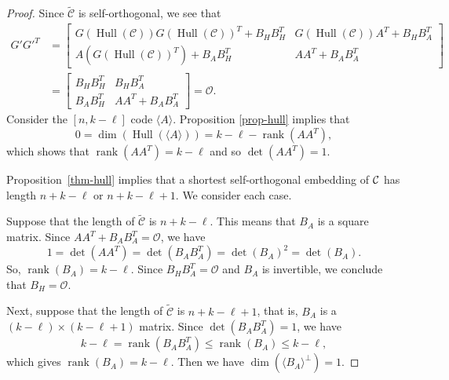 \documentclass{article}
\theoremstyle{definition}
\theoremstyle{remark}
\newcommand{\C}{\mbox{$\cal C$}}
\newcommand{\Hull}{\operatorname{Hull}}
\newcommand{\rank}{\operatorname{rank}}
\begin{document}
\begin{proof}
    Since $\tilde{\mathcal{C}}$ is self-orthogonal, we see that
    \begin{align*}
    G'G'^T&=\begin{bmatrix}
        G(\operatorname{Hull}(\mathcal{C}))G(\operatorname{Hull}(\mathcal{C}))^T+B_HB_H^T & G(\operatorname{Hull}(\mathcal{C}))A^T+B_HB_A^T\\A(G(\operatorname{Hull}(\mathcal{C}))^T)+B_AB_H^T & AA^T+B_AB_A^T
    \end{bmatrix}\\&=
    \begin{bmatrix}
        B_HB_H^T & B_HB_A^T\\B_AB_H^T & AA^T+B_AB_A^T
    \end{bmatrix}=\mathcal{O}.
    \end{align*}
    Consider the $[n, k-\ell]$ code $\langle A\rangle$. Proposition \ref{prop-hull} implies that
\[
0=\dim(\Hull(\langle A\rangle))=k-\ell-\operatorname{rank}(AA^T),
\]
which shows that $\rank(A A^T) = k-\ell$ and so $\det(AA^T)=1$.

Proposition~\ref{thm-hull} implies that a shortest self-orthogonal embedding of $\C$ has length $n+k-\ell$ or $n+k-\ell+1$.  We consider each case.

    Suppose that the length of $\tilde{\mathcal{C}}$ is $n+k-\ell$. This means that $B_A$ is a square matrix.  Since $AA^T+B_AB_A^T=\mathcal{O}$, we have
    \[
    1=\det(AA^T)=\det(B_AB_A^T)=\det(B_A)^2=\det(B_A).
    \]
    So, $\rank(B_A) = k-\ell$. Since $B_HB_A^T=\mathcal{O}$ and $B_A$ is invertible, we conclude that $B_H=\mathcal{O}$.

    Next, suppose that the length of $\tilde{\mathcal{C}}$ is $n+k-\ell + 1$, that is, $B_A$ is a $(k-\ell)\times (k-\ell+1)$ matrix. Since $\det(B_AB_A^T)=1$, we have
    \[
    k-\ell=\operatorname{rank}(B_AB_A^T)\le \operatorname{rank}(B_A)\le k-\ell,
    \]
    which gives $\operatorname{rank}(B_A)=k-\ell$. Then we have $\dim(\langle B_A\rangle^\perp)=1$.


\end{proof}
\end{document}

